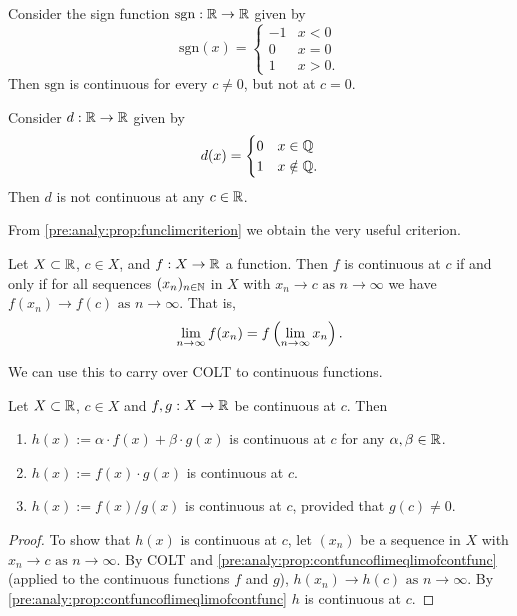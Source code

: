\documentclass[10pt, a4paper]{article}
\newcommand{\seq}[1][x]{(#1_n)_{n \in \N}}
\newcommand{\limas}[3][n]{#2 \rightarrow #3 \text{ as } #1 \rightarrow \infty}
\begin{document}
\begin{example}
    Consider the sign function $\mathrm{sgn} : \mathbb{R} \rightarrow \mathbb{R}$ given by
    \[
    \mathrm{sgn}(x) = \begin{cases}
        -1 & x < 0 \\
        0 & x = 0 \\
        1 & x > 0.
    \end{cases}
    \]
    Then $\mathrm{sgn}$ is continuous for every $c \neq 0$,
    but not at $c = 0$.
\end{example}

\begin{example}
    Consider $d : \mathbb{R} \rightarrow \mathbb{R}$ given by
    \[
    d(x) = \begin{cases}
        0 & x \in \mathbb{Q} \\
        1 & x \notin \mathbb{Q}.
    \end{cases}
    \]
    Then $d$ is not continuous at any $c \in \mathbb{R}$.
\end{example}

From \autoref{pre:analy:prop:funclimcriterion} we obtain the very useful criterion.
\begin{proposition}\label{pre:analy:prop:contfuncoflimeqlimofcontfunc}
    Let $X \subset \mathbb{R}$,
    $c \in X$,
    and $f : X \rightarrow \mathbb{R}$ a function.
    Then $f$ is continuous at $c$ if and only if for all sequences $\seq$ in $X$ with $\limas{x_n}{c}$ we have $\limas{f(x_n)}{f(c)}$.
    That is,
    \[
    \lim_{n \rightarrow \infty} f(x_n) = f\left(\lim_{n \rightarrow \infty} x_n\right).
    \]
\end{proposition}

We can use this to carry over COLT to continuous functions.
\begin{theorem}\label{pre:analy:thm:coltforcontfuncs}
    Let $X \subset \mathbb{R}$,
    $c \in X$ and $f, g : X \rightarrow \mathbb{R}$ be continuous at $c$.
    Then
    \begin{enumerate}[label = (\roman*)]
        \item $h(x) := \alpha \cdot f(x) + \beta \cdot g(x)$ is continuous at $c$ for any $\alpha, \beta \in \mathbb{R}$.
        \item $h(x) := f(x) \cdot g(x)$ is continuous at $c$.
        \item $h(x) := f(x) / g(x)$ is continuous at $c$,
        provided that $g(c) \neq 0$.
    \end{enumerate}
    \begin{proof}
        To show that $h(x)$ is continuous at $c$,
        let $(x_n)$ be a sequence in $X$ with $\limas{x_n}{c}$.
        By COLT and \autoref{pre:analy:prop:contfuncoflimeqlimofcontfunc}
        (applied to the continuous functions $f$ and $g$),
        $\limas{h(x_n)}{h(c)}$.
        By \autoref{pre:analy:prop:contfuncoflimeqlimofcontfunc} $h$ is continuous at $c$.
    \end{proof}
\end{theorem}
\end{document}
